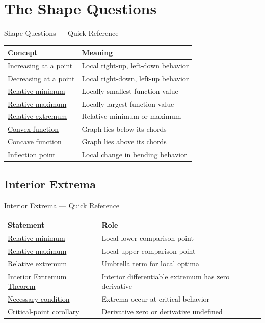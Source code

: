 \section{The Shape Questions}

\begin{toolkitbox}{Shape Questions --- Quick Reference}
\small
\begin{tabular}{l l}
\toprule
\textbf{Concept} & \textbf{Meaning} \\
\midrule
\hyperref[def:increasing-at-a-point]{Increasing at a point} & Local right-up, left-down behavior \\
\hyperref[def:decreasing-at-a-point]{Decreasing at a point} & Local right-down, left-up behavior \\
\hyperref[def:relative-minimum]{Relative minimum} & Locally smallest function value \\
\hyperref[def:relative-maximum]{Relative maximum} & Locally largest function value \\
\hyperref[def:relative-extremum]{Relative extremum} & Relative minimum or maximum \\
\hyperref[def:convex-function]{Convex function} & Graph lies below its chords \\
\hyperref[def:concave-function]{Concave function} & Graph lies above its chords \\
\hyperref[def:inflection-point]{Inflection point} & Local change in bending behavior \\
\bottomrule
\end{tabular}
\end{toolkitbox}



\subsection{Interior Extrema}

\begin{toolkitbox}{Interior Extrema --- Quick Reference}
\small
\begin{tabular}{l l}
\toprule
\textbf{Statement} & \textbf{Role} \\
\midrule
\hyperref[def:relative-minimum]{Relative minimum} & Local lower comparison point \\
\hyperref[def:relative-maximum]{Relative maximum} & Local upper comparison point \\
\hyperref[def:relative-extremum]{Relative extremum} & Umbrella term for local optima \\
\hyperref[thm:interior-extremum-theorem]{Interior Extremum Theorem} & Interior differentiable extremum has zero derivative \\
\hyperref[thm:necessary-condition-extremum]{Necessary condition} & Extrema occur at critical behavior \\
\hyperref[cor:relative-extremum-necessary-condition]{Critical-point corollary} & Derivative zero or derivative undefined \\
\bottomrule
\end{tabular}
\end{toolkitbox}


